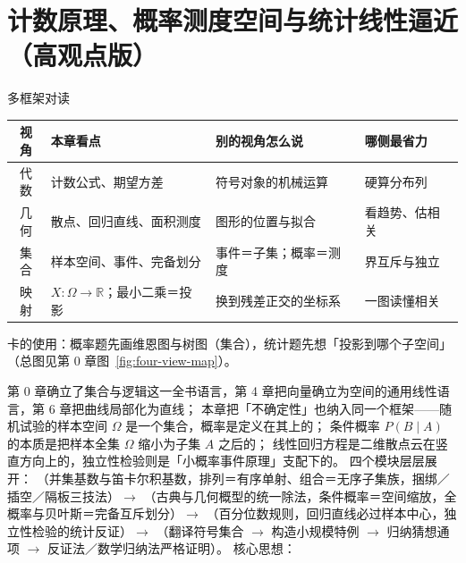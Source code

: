 
\section{计数原理、概率测度空间与统计线性逼近（高观点版）}

\begin{methodbox}{多框架对读}
\small
\begin{center}
\begin{tabular}{c|p{2.9cm}|p{5.0cm}|p{3.1cm}}
\toprule
视角 & 本章看点 & 别的视角怎么说 & 哪侧最省力 \\
\midrule
代数 & 计数公式、期望方差 & 符号对象的机械运算 & 硬算分布列 \\
几何 & 散点、回归直线、面积测度 & 图形的位置与拟合 & 看趋势、估相关 \\
集合 & 样本空间、事件、完备划分 & 事件＝子集；概率＝测度 & 界互斥与独立 \\
映射 & $X:\Omega\to\mathbb R$；最小二乘＝投影 & 换到残差正交的坐标系 & 一图读懂相关 \\
\bottomrule
\end{tabular}
\end{center}
卡的使用：概率题先画维恩图与树图（集合），统计题先想「投影到哪个子空间」（总图见第 0 章图~\ref{fig:four-view-map}）。
\end{methodbox}

第 0 章确立了集合与逻辑这一全书语言，第 4 章把向量确立为空间的通用线性语言，第 6 章把曲线局部化为直线；
本章把「不确定性」也纳入同一个框架——随机试验的样本空间 $\Omega$ 是一个集合，概率是定义在其上的；
条件概率 $P(B\mid A)$ 的本质是把样本全集 $\Omega$ 缩小为子集 $A$ 之后的；
线性回归方程是二维散点云在竖直方向上的，独立性检验则是「小概率事件原理」支配下的。
四个模块层层展开：
（并集基数与笛卡尔积基数，排列＝有序单射、组合＝无序子集族，捆绑／插空／隔板三技法）$\to$
（古典与几何概型的统一除法，条件概率＝空间缩放，全概率与贝叶斯＝完备互斥划分）$\to$
（百分位数规则，回归直线必过样本中心，独立性检验的统计反证）$\to$
（翻译符号集合 $\to$ 构造小规模特例 $\to$ 归纳猜想通项 $\to$ 反证法／数学归纳法严格证明）。
核心思想：

